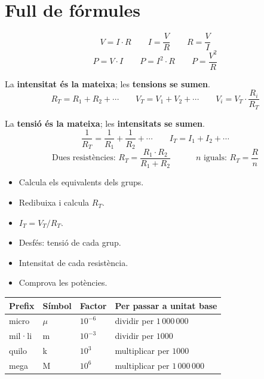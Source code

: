 \section*{Full de fórmules}

\begin{tcolorbox}[colback=blau!5, colframe=blau, title={Llei d'Ohm i potència}]
\[ V = I \cdot R \qquad I = \frac{V}{R} \qquad R = \frac{V}{I} \]
\[ P = V \cdot I \qquad P = I^2 \cdot R \qquad P = \frac{V^2}{R} \]
\end{tcolorbox}

\begin{tcolorbox}[colback=verd!6, colframe=verd, title={En sèrie}]
La \textbf{intensitat és la mateixa}; les \textbf{tensions se sumen}.
\[ R_T = R_1 + R_2 + \cdots \qquad V_T = V_1 + V_2 + \cdots \qquad V_i = V_T \cdot \frac{R_i}{R_T} \]
\end{tcolorbox}

\begin{tcolorbox}[colback=taronja!8, colframe=taronja, title={En paral·lel}]
La \textbf{tensió és la mateixa}; les \textbf{intensitats se sumen}.
\[ \frac{1}{R_T} = \frac{1}{R_1} + \frac{1}{R_2} + \cdots \qquad I_T = I_1 + I_2 + \cdots \]
\[ \text{Dues resistències: } R_T = \frac{R_1 \cdot R_2}{R_1 + R_2} \qquad\quad n \text{ iguals: } R_T = \frac{R}{n} \]
\end{tcolorbox}

\begin{tcolorbox}[colback=lila!6, colframe=lila, title={Circuit mixt: reduir i desfer}]
\begin{itemize}
 \item \textbf{} Calcula els equivalents dels grups. 
 \item \textbf{} Redibuixa i calcula $R_T$. 
 \item \textbf{} $I_T = V_T / R_T$. 
 \item \textbf{} Desfés: tensió de cada grup. 
 \item \textbf{} Intensitat de cada resistència. 
 \item \textbf{} Comprova les potències.
\end{itemize}
\end{tcolorbox}

\begin{center}
\renewcommand{\arraystretch}{1.4}
\begin{tabular}{@{}llll@{}}
\toprule
\textbf{Prefix} & \textbf{Símbol} & \textbf{Factor} & \textbf{Per passar a unitat base}\\
\midrule
micro & $\mu$ & $10^{-6}$ & dividir per $1\,000\,000$\\
mil·li & m & $10^{-3}$ & dividir per $1000$\\
quilo & k & $10^{3}$ & multiplicar per $1000$\\
mega & M & $10^{6}$ & multiplicar per $1\,000\,000$\\
\bottomrule
\end{tabular}
\end{center}
